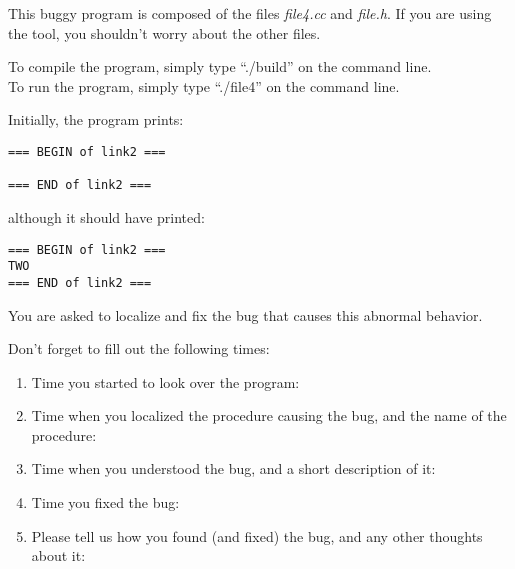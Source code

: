 \documentclass{article}
\title{}
\author{Debugging experiment - Bug 4}
\date{July 30, 2003}
\begin{document}
\maketitle
\begin{flushleft}
\vspace{0.5in}

\thispagestyle{empty}

This buggy program is composed of the files {\it file4.cc} and 
{\it file.h}. If you are using the tool, you shouldn't worry about the 
other files.

\vspace{0.1in}
To compile the program, simply type ``./build'' on the command line.\\
To run the program, simply type ``./file4'' on the command line.


\vspace{0.1in}
Initially, the program prints:

\begin{verbatim}
=== BEGIN of link2 ===

=== END of link2 ===
\end{verbatim}

although it should have printed:
\begin{verbatim}
=== BEGIN of link2 ===
TWO
=== END of link2 ===
\end{verbatim}

You are asked to localize and fix the bug that causes this abnormal behavior.
 

\vspace{0.3in}
Don't forget to fill out the following times:
\begin{enumerate}
\item{Time you started to look over the program:}
\item{Time when you localized the procedure causing the bug, and the name
      of the procedure:\vspace{0.2in}}
\item{Time when you understood the bug, and a short description of it:\vspace{0.4in}}

\item{Time you fixed the bug:}

\item{Please tell us how you found (and fixed) the bug, and any other thoughts 
about it:}

\end{enumerate}

\end{flushleft}
\end{document}
